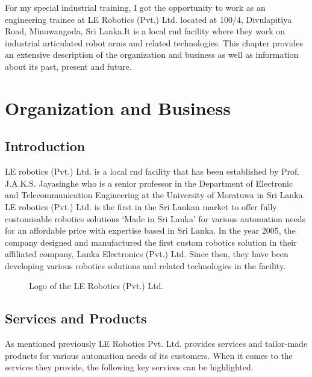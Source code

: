 \documentclass[a4paper,12pt]{report}
\begin{document}
For my special industrial training, I got the opportunity to work as an engineering trainee at LE Robotics (Pvt.) Ltd. located at 100/4, Divulapitiya Road, Minuwangoda, Sri Lanka.It is a local \ac{rnd} facility where they work on industrial articulated robot arms and related technologies. This chapter provides an extensive description of the organization and business as well as information about its past, present and future.

\section{Organization and Business}

\subsection{Introduction}
LE robotics (Pvt.) Ltd. is a local \ac{rnd} facility that has been established by Prof. J.A.K.S. Jayasinghe who is a senior professor in the Department of Electronic and Telecommunication Engineering at the University of Moratuwa in Sri Lanka.\\

LE robotics (Pvt.) Ltd. is the first in the Sri Lankan market to offer fully customisable robotics solutions `Made in Sri Lanka' for various automation needs for an affordable price with expertise based in Sri Lanka. In the year 2005, the company designed and manufactured the first custom robotics solution in their affiliated company, Lanka Electronics (Pvt.) Ltd. Since then, they have been developing various robotics solutions and related technologies in the facility.

\begin{figure}[h]
	\centering
	\caption{Logo of the LE Robotics (Pvt.) Ltd.}
	\label{fig:logoler}
\end{figure}

\subsection{Services and Products}
\label{Services and Products}
As mentioned previously LE Robotics Pvt. Ltd. provides services and tailor-made products for various automation needs of its customers. When it comes to the services they provide, the following key services can be highlighted.
\end{document}

